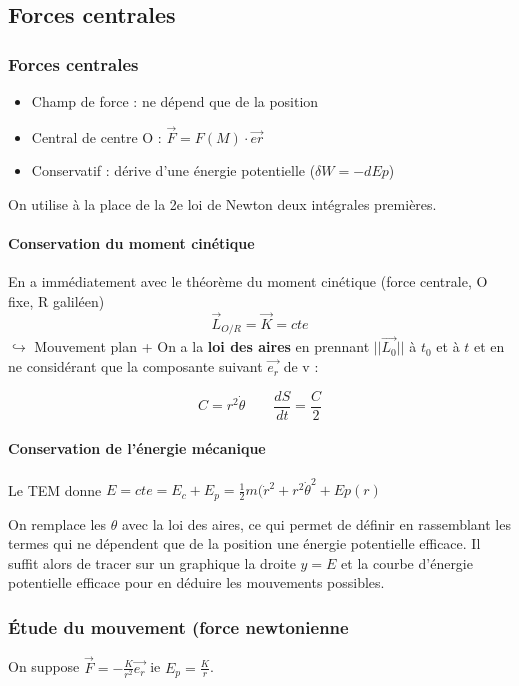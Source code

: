 \documentclass[9pt]{article}
\begin{document}
\begin{multicols*}{2}
\setlength{\columnseprule}{0.1pt}
\part{Forces centrales}
\section{Forces centrales}
\begin{itemize}
  \item Champ de force : ne dépend que de la position
  \item Central de centre O : $\overrightarrow{F} = F(M) \cdot \overrightarrow{er}$
  \item Conservatif : dérive d'une énergie potentielle ($\delta W = -dEp$)
\end{itemize}

On utilise à la place de la 2e loi de Newton deux intégrales premières.
\subsection{Conservation du moment cinétique}
En a immédiatement avec le théorème du moment cinétique (force centrale, O fixe, R galiléen)
$$\overrightarrow{L}_{O/R} = \overrightarrow{K} = cte$$
$\hookrightarrow$ Mouvement plan + On a la \textbf{loi des aires} en prennant $||\overrightarrow{L_0}||$ à $t_0$ et à $t$ et en ne considérant que la composante suivant $\overrightarrow{e_r}$ de v :

$$\boxed{C = r^2 \dot{\theta}} \qquad \frac{dS}{dt} = \frac{C}{2}$$

\subsection{Conservation de l'énergie mécanique}
Le TEM donne $E = cte = E_c + E_p = \frac{1}{2}m(\dot{r}^2 + r^2 \dot{\theta}^2 + Ep(r)$

On remplace les $\theta$ avec la loi des aires, ce qui permet de définir en rassemblant les termes qui ne dépendent que de la position une énergie potentielle efficace. Il suffit alors de tracer sur un graphique la droite $y = E$ et la courbe d'énergie potentielle efficace pour en déduire les mouvements possibles.

\section{Étude du mouvement (force newtonienne}
On suppose $\overrightarrow{F} = -\frac{K}{r^2}\overrightarrow{e_r}$ ie $E_p = \frac{K}{r}$.


\end{multicols*}
\end{document}
